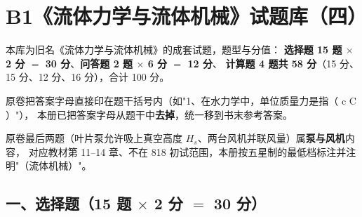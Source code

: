 \chapter*{B1\quad 《流体力学与流体机械》试题库（四）}

\begin{tishi}
本库为旧名《流体力学与流体机械》的成套试题，题型与分值：
\textbf{选择题 15 题 $\times$ 2 分 $=$ 30 分}、\textbf{问答题 2 题 $\times$ 6 分 $=$ 12 分}、
\textbf{计算题 4 题共 58 分}（15 分、15 分、12 分、16 分），合计 100 分。

原卷把答案字母直接印在题干括号内（如"1、在水力学中，单位质量力是指（ c C ）"），
本册已把答案字母从题干中\textbf{去掉}，统一移到书末参考答案。

原卷最后两题（叶片泵允许吸上真空高度 $H_s$、两台风机并联风量）属\textbf{泵与风机}内容，
对应教材第 11--14 章、不在 818 初试范围，本册按五星制的最低档标注并注明"（流体机械）"。
\end{tishi}

\section*{一、选择题（15 题 $\times$ 2 分 $=$ 30 分）}

